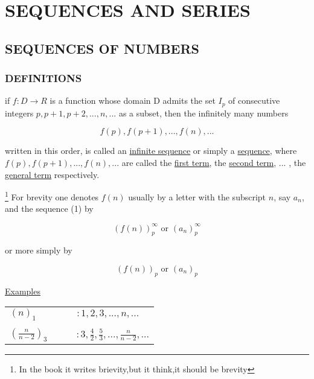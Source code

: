 \documentclass[11pt]{amsbook}
\begin{document}
\chapter{SEQUENCES AND SERIES}
\label{chap:SequencesandSeries}




\section{SEQUENCES OF NUMBERS}
\label{sec:SequencesNum}




\subsection{DEFINITIONS}
\label{subsec:Definitions}

	if $ f : D\rightarrow R  $ 
	is a function whose domain D admits the set
	$ I_{p} $
	of consecutive integers
	$ p, p+1, p+2,..., n, ... $
	as a subset, then the infinitely many numbers
	
		\begin{equation}
	     f(p),f(p+1), ... , f(n) , ... 	
		\end{equation}
	
	written in this order, is called an 
	\underline{infinite sequence} 
	or simply a \underline{sequence}, where
		$f(p),f(p+1), ... , f(n) , ... $
	are called the \underline{first term},
	the \underline{second term}, ... , the
	 \underline{general term} respectively.
	 
	\footnote{In the book it writes brievity,but it think,it should be brevity}
	For brevity one denotes $ f(n)$ usually by a letter with 
	the subscript $n$, say $a_{n}$, and the sequence (1) by
	
		$$ (f(n))_{p}^{\infty}   
			\text{ or }
			(a_{n})_{p}^{\infty}  
		$$
		
	or more simply by
	
	$$ (f(n))_{p}   
	\text{ or }
	(a_{n})_{p}  
	$$
	
	\underline{Examples}
	\newline	

    \begin{tabular}{ l c }
        $ (n)_{1} $               &  $ \quad : 1, 2, 3, ..., n, ...$  \\ \\
        
        
        $ (\frac{n}{n-2})_{3} $   &  $ \qquad : 3, \frac{4}{2}, \frac{5}{3}, ..., \frac{n}{n-2}, ...$ \\
        
    \end{tabular}








\end{document}
